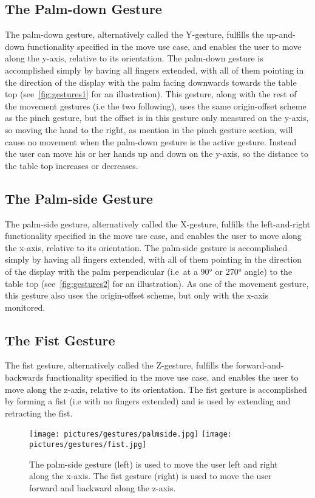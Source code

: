 \subsection{The Palm-down Gesture}
\label{sec:palm_down_design}
The palm-down gesture, alternatively called the Y-gesture, fulfills the up-and-down functionality specified in the move use case, and enables the user to 
move along the y-axis, relative to its orientation. The palm-down gesture is accomplished simply by having all fingers extended, with all of them pointing in
the direction of the display with the palm facing downwards towards the table top (see~\vref{fig:gestures1} for an illustration). This gesture, along with the rest of the 
movement gestures (i.e the two following), uses the same origin-offset scheme as the pinch gesture, but the offset is in this gesture only measured on the y-axis, 
so moving the hand to the 
right, as mention in the pinch gesture section, will cause no movement when the palm-down gesture is the active gesture. 
Instead the user can move his or her hands up and down on the y-axis, so the distance to the table top increases or decreases.  

\subsection{The Palm-side Gesture}
The palm-side gesture, alternatively called the X-gesture, fulfills the left-and-right functionality specified in the move use case, and enables the user to 
move along the x-axis, relative to its orientation. The palm-side gesture is accomplished simply by having all fingers extended, with all of them pointing in
the direction of the display with the palm perpendicular (i.e~at a 90° or 270° angle) to the table top (see~\vref{fig:gestures2} for an illustration). 
As one of the movement gesture, this gesture also uses the origin-offset scheme, but only with the x-axis monitored.

\subsection{The Fist Gesture}
The fist gesture, alternatively called the Z-gesture, fulfills the forward-and-backwards functionality specified in the move use case, and enables the user to 
move along the z-axis, relative to its orientation. The fist gesture is accomplished by forming a fist (i.e with no fingers extended)
and is used by extending and retracting the fist. 

\begin{figure}%
	\texttt{[image: pictures/gestures/palmside.jpg]}
    \texttt{[image: pictures/gestures/fist.jpg]}
	\caption[The palm-side and fist gestures]{The palm-side gesture (left) is used to move the user left and right along the x-axis. 
             The fist gesture (right) is used to move the user forward and backward along the z-axis.}
	\label{fig:gestures2}
\end{figure} 

